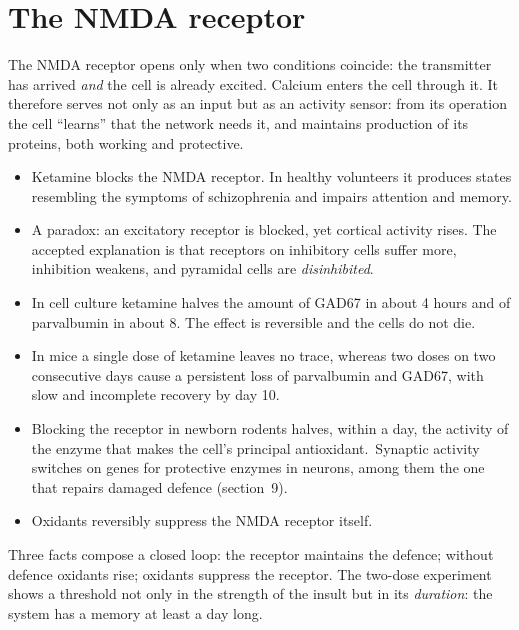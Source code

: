 \section{The NMDA receptor}
The NMDA receptor opens only when two conditions coincide: the transmitter has arrived \emph{and} the cell is already excited. Calcium enters the cell through it. It therefore serves not only as an input but as an activity sensor: from its operation the cell ``learns'' that the network needs it, and maintains production of its proteins, both working and protective.
\facts
\begin{itemize}
\item Ketamine blocks the NMDA receptor. In healthy volunteers it produces states resembling the symptoms of schizophrenia and impairs attention and memory.\tP
\item A paradox: an excitatory receptor is blocked, yet cortical activity rises. The accepted explanation is that receptors on inhibitory cells suffer more, inhibition weakens, and pyramidal cells are \emph{disinhibited}.\tU
\item In cell culture ketamine halves the amount of GAD67 in about 4 hours and of parvalbumin in about 8. The effect is reversible and the cells do not die.\tS
\item In mice a single dose of ketamine leaves no trace, whereas two doses on two consecutive days cause a persistent loss of parvalbumin and GAD67, with slow and incomplete recovery by day 10.\tS
\item Blocking the receptor in newborn rodents halves, within a day, the activity of the enzyme that makes the cell's principal antioxidant.\tS\ Synaptic activity switches on genes for protective enzymes in neurons, among them the one that repairs damaged defence (section~9).\tP
\item Oxidants reversibly suppress the NMDA receptor itself.\tS
\end{itemize}
\begin{ineq}
Three facts compose a closed loop: the receptor maintains the defence; without defence oxidants rise; oxidants suppress the receptor. The two-dose experiment shows a threshold not only in the strength of the insult but in its \emph{duration}: the system has a memory at least a day long.
\end{ineq}

